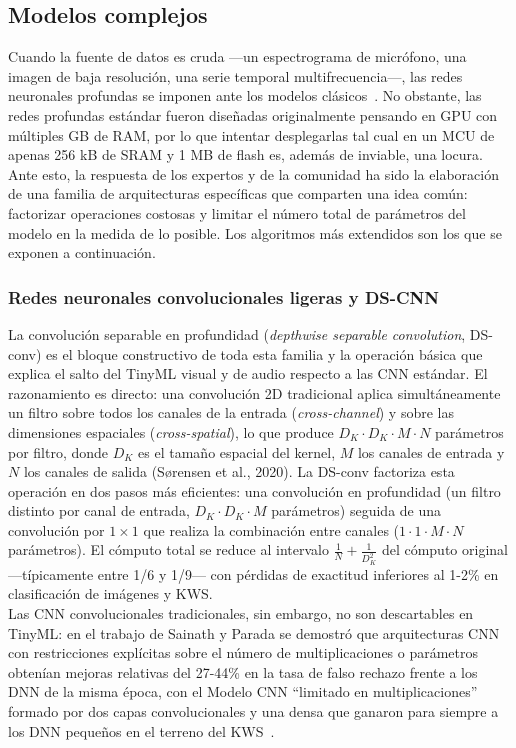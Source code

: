 \documentclass[a4paper,12pt,twoside,final]{book}
\begin{document}
\subsection{Modelos complejos}
Cuando la fuente de datos es cruda ---un espectrograma de micrófono, una imagen de baja resolución, una serie temporal
multifrecuencia---, las redes neuronales profundas se imponen ante los modelos clásicos~\cite{zhang2022helloedge,
miah2022iceiec}. No obstante, las redes profundas estándar fueron diseñadas originalmente pensando en GPU con
múltiples GB de RAM, por lo que intentar desplegarlas tal cual en un MCU de apenas 256 kB de SRAM y 1 MB de flash es,
además de inviable, una locura. Ante esto, la respuesta de los expertos y de la comunidad ha sido la elaboración de
una familia de arquitecturas específicas que comparten una idea común: factorizar operaciones costosas y limitar el
número total de parámetros del modelo en la medida de lo posible. Los algoritmos más extendidos son los que se exponen
a continuación.

\subsubsection{Redes neuronales convolucionales ligeras y DS-CNN}
La convolución separable en profundidad (\textit{depthwise separable convolution}, DS-conv) es el bloque constructivo
de toda esta familia y la operación básica que explica el salto del TinyML visual y de audio respecto a las CNN
estándar. El razonamiento es directo: una convolución 2D tradicional aplica simultáneamente un filtro sobre todos los
canales de la entrada (\textit{cross-channel}) y sobre las dimensiones espaciales (\textit{cross-spatial}), lo que
produce $D_K \cdot D_K \cdot M \cdot N$ parámetros por filtro, donde $D_K$ es el tamaño espacial del kernel, $M$ los
canales de entrada y $N$ los canales de salida (Sørensen et al., 2020). La DS-conv factoriza esta operación en dos
pasos más eficientes: una convolución en profundidad (un filtro distinto por canal de entrada,
$D_K \cdot D_K \cdot M$ parámetros) seguida de una convolución por $1\times 1$ que realiza la combinación entre
canales ($1\cdot 1\cdot M\cdot N$ parámetros). El cómputo total se reduce al intervalo $\frac{1}{N} + \frac{1}{D_K^2}$
del cómputo original ---típicamente entre 1/6 y 1/9--- con pérdidas de exactitud inferiores al 1-2\% en clasificación
de imágenes y KWS.\\

Las CNN convolucionales tradicionales, sin embargo, no son descartables en TinyML: en el trabajo de Sainath y Parada
se demostró que arquitecturas CNN con restricciones explícitas sobre el número de multiplicaciones o parámetros
obtenían mejoras relativas del 27-44\% en la tasa de falso rechazo frente a los DNN de la misma época, con el Modelo
CNN ``limitado en multiplicaciones'' formado por dos capas convolucionales y una densa que ganaron para siempre a los
DNN pequeños en el terreno del KWS~\cite{sørensen2022journalonasm,sainath2015interspeech}.\\
\end{document}
